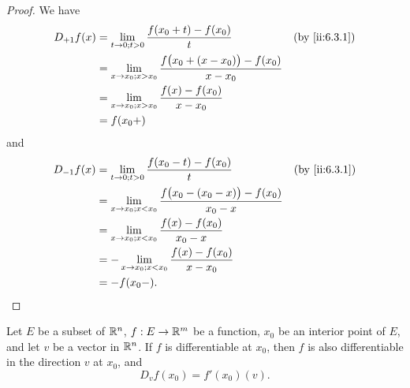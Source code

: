 \begin{proof}
  We have
  \begin{align*}
    D_{+1} f(x) & = \lim_{t \to 0 ; t > 0} \dfrac{f(x_0 + t) - f(x_0)}{t}                           &  & \by{ii:6.3.1} \\
                & = \lim_{x \to x_0 ; x > x_0} \dfrac{f\big(x_0 + (x - x_0)\big) - f(x_0)}{x - x_0}                 \\
                & = \lim_{x \to x_0 ; x > x_0} \dfrac{f(x) - f(x_0)}{x - x_0}                                       \\
                & = f(x_0+)
  \end{align*}
  and
  \begin{align*}
    D_{-1} f(x) & = \lim_{t \to 0 ; t > 0} \dfrac{f(x_0 - t) - f(x_0)}{t}                           &  & \by{ii:6.3.1} \\
                & = \lim_{x \to x_0 ; x < x_0} \dfrac{f\big(x_0 - (x_0 - x)\big) - f(x_0)}{x_0 - x}                 \\
                & = \lim_{x \to x_0 ; x < x_0} \dfrac{f(x) - f(x_0)}{x_0 - x}                                       \\
                & = -\lim_{x \to x_0 ; x < x_0} \dfrac{f(x) - f(x_0)}{x - x_0}                                      \\
                & = -f(x_0-).
  \end{align*}
\end{proof}

\setcounter{thm}{4}
\begin{lem}\label{ii:6.3.5}
  Let \(E\) be a subset of \(\mathbb{R}^n\), \(f : E \to \mathbb{R}^m\) be a function, \(x_0\) be an interior point of \(E\), and let \(v\) be a vector in \(\mathbb{R}^n\).
  If \(f\) is differentiable at \(x_0\), then \(f\) is also differentiable in the direction \(v\) at \(x_0\), and
  \[
    D_v f(x_0) = f'(x_0)(v).
  \]
\end{lem}

